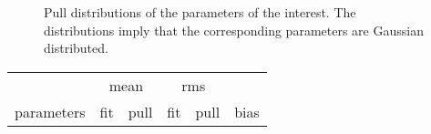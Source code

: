 \begin{figure}[!h]
\begin{subfigure}{0.5\textwidth}
    \scalebox{0.60}{}
    \caption{}
    \label{pull_ASMag2_bin4}
  \end{subfigure}%
  \hfill%
  \begin{subfigure}{0.5\textwidth}
    \scalebox{0.60}{}
    \caption{}
    \label{pull_ASPhase_bin4}
  \end{subfigure}
\caption{Pull distributions of the parameters of the \swave interest. The distributions imply that the corresponding parameters are Gaussian distributed.}
\label{pull_swave}
\end{figure}

\begin{table}
  \centering
  \begin{tabular}{c c c c c | c}
    \cline{2-5}
               & \multicolumn{2}{c}{mean} & \multicolumn{2}{c}{rms} &  \\
    \cline{2-6}
    parameters & fit & pull & fit & pull & bias \\
    \cline{1-6}


\end{tabular}
\end{table}
